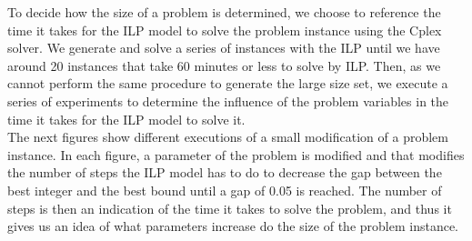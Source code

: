 To decide how the size of a problem is determined, we choose to reference the time it takes for the ILP model to solve the problem instance using the Cplex solver. We generate and solve a series of instances with the ILP until we have around 20 instances that take 60 minutes or less to solve by ILP. Then, as we cannot perform the same procedure to generate the large size set, we execute a series of experiments to determine the influence of the problem variables in the time it takes for the ILP model to solve it.\\

The next figures show different executions of a small modification of a problem instance. In each figure, a parameter of the problem is modified and that modifies the number of steps the ILP model has to do to decrease the gap between the best integer and the best bound until a gap of 0.05 is reached. The number of steps is then an indication of the time it takes to solve the problem, and thus it gives us an idea of what parameters increase do the size of the problem instance.\\


